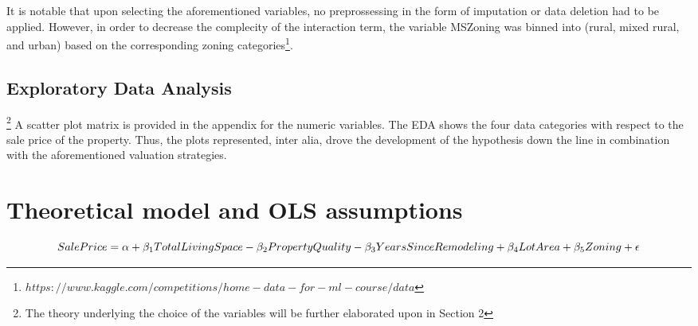 \documentclass{article}
\begin{document}
It is notable that upon selecting the aforementioned variables, no preprossessing in the form of imputation or data deletion had to be applied. However, in order to decrease the complecity of the interaction term, the variable MSZoning was binned into (rural, mixed rural, and urban) based on the corresponding zoning categories\footnote{$https://www.kaggle.com/competitions/home-data-for-ml-course/data$}.


\subsection{Exploratory Data Analysis}\footnote{The theory underlying the choice of the variables will be further elaborated upon in Section 2}
A scatter plot matrix is provided in the appendix for the numeric variables. The EDA shows the four data categories with respect to the sale price of the property. Thus, the plots represented, inter alia, drove the development of the hypothesis down the line in combination with the aforementioned valuation strategies. 

\section{Theoretical model and OLS assumptions}




\begin{center}
\end{center}

$$ {SalePrice} = \alpha + \beta_{1} TotalLivingSpace - \beta_{2}  Property Quality - \beta_{3}  YearsSinceRemodeling  \linebreak
+ \beta_{4}  LotArea + \beta_{5} Zoning + \epsilon$$
\end{document}
